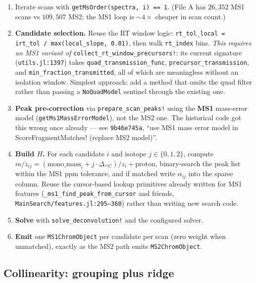 \documentclass[11pt]{article}
\newcommand{\code}[1]{\texttt{\small #1}}
\newcommand{\file}[1]{\textcolor{blue!50!black}{\texttt{\small #1}}}
\begin{document}
\begin{enumerate}[nosep]
  \item Iterate scans with \code{getMsOrder(spectra, i) == 1}. (File A has $26{,}352$ MS1 scans
        vs $109{,}507$ MS2; the MS1 loop is $\sim4\times$ cheaper in scan count.)
  \item \textbf{Candidate selection.} Reuse the RT window logic:
        \code{rt\_tol\_local = irt\_tol / max(local\_slope, 0.01)}, then walk \code{rt\_index}
        bins. \emph{This requires an MS1 variant of} \code{collect\_rt\_window\_precursors!}:
        its current signature (\file{utils.jl:1397}) takes \code{quad\_transmission\_func},
        \code{precursor\_transmission}, and \code{min\_fraction\_transmitted}, all of which
        are meaningless without an isolation window. Simplest approach: add a method that
        omits the quad filter rather than passing a \code{NoQuadModel} sentinel through the
        existing one.
  \item \textbf{Peak pre-correction} via \code{prepare\_scan\_peaks!} using the
        \textbf{MS1} mass-error model (\code{getMs1MassErrorModel}), not the MS2 one. The
        historical code got this wrong once already --- see \code{9b46e745a},
        ``use MS1 mass error model in ScoreFragmentMatches! (replace MS2 model)''.
  \item \textbf{Build $H$.} For each candidate $i$ and isotope $j \in \{0,1,2\}$, compute
        $m/z_{ij} = (\text{mono\_mass}_i + j\cdot\Delta_{^{13}\mathrm{C}})/z_i + \text{proton}$,
        binary-search the peak list within the MS1 ppm tolerance, and if matched write
        $\alpha_{ij}$ into the sparse column. Reuse the cursor-based lookup primitives
        already written for MS1 features (\code{\_ms1\_find\_peak\_from\_cursor} and friends,
        \file{MainSearch/features.jl:295--360}) rather than writing new search code.
  \item \textbf{Solve} with \code{solve\_deconvolution!} and the configured solver.
  \item \textbf{Emit} one \code{MS1ChromObject} per candidate per scan (zero weight when unmatched),
        exactly as the MS2 path emits \code{MS2ChromObject}.
\end{enumerate}

\subsection{Collinearity: grouping plus ridge}
\label{sec:collin}
\end{document}
